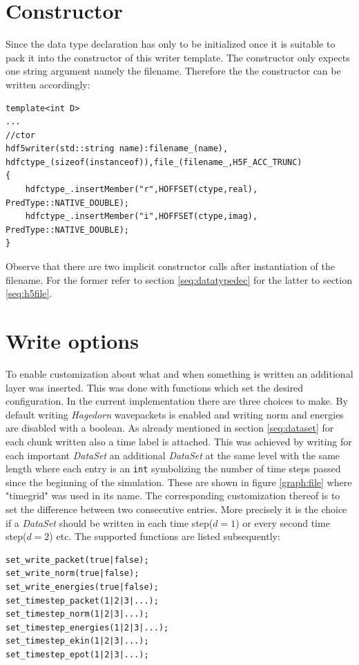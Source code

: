 \section{Constructor}
\label{seq:ctor}
Since the data type declaration has only to be initialized once it is suitable to pack it into the constructor of this writer template. The constructor only expects one string argument namely the filename. Therefore the the constructor can be written accordingly:
\begin{lstlisting}
template<int D>
...
//ctor
hdf5writer(std::string name):filename_(name), hdfctype_(sizeof(instanceof)),file_(filename_,H5F_ACC_TRUNC)
{
	hdfctype_.insertMember("r",HOFFSET(ctype,real), PredType::NATIVE_DOUBLE);
	hdfctype_.insertMember("i",HOFFSET(ctype,imag), PredType::NATIVE_DOUBLE);
}
\end{lstlisting}
Observe that there are two implicit constructor calls after instantiation of the filename. For the former refer to section \ref{seq:datatypedec} for the latter to section \ref{seq:h5file}.

\section{Write options}
To enable customization about what and when something is written an additional layer was inserted. This was done with functions which set the desired configuration. In the current implementation there are three choices to make. By default writing \textit{Hagedorn} wavepackets is enabled and writing norm and energies are disabled with a boolean. As already mentioned in section \ref{seq:dataset} for each chunk written also a time label is attached. This was achieved by writing for each important \textit{DataSet} an additional \textit{DataSet} at the same level with the same length where each entry is an \texttt{int} symbolizing the number of time steps passed since the beginning of the simulation. These are shown in figure \ref{graph:file} where "timegrid" was used in its name. The corresponding customization thereof is to set the difference between two consecutive entries. More precisely it is the choice if a \textit{DataSet} should be written in each time step($d=1$) or every second time step($d=2$) etc. The supported functions are listed subsequently:
\begin{lstlisting}
set_write_packet(true|false);
set_write_norm(true|false);
set_write_energies(true|false);
set_timestep_packet(1|2|3|...);
set_timestep_norm(1|2|3|...);
set_timestep_energies(1|2|3|...);
set_timestep_ekin(1|2|3|...);
set_timestep_epot(1|2|3|...);
\end{lstlisting}

